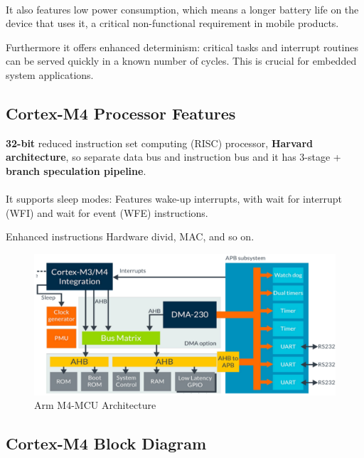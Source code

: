 \paragraph{}
It also features low power consumption, which means a longer battery life on the device that uses it, a
critical non-functional requirement in mobile products.

Furthermore it offers enhanced determinism: critical tasks and interrupt routines can be served quickly in
a known number of cycles. This is crucial for embedded system applications.

\subsection{Cortex-M4 Processor Features}

\textbf{32-bit} reduced instruction set computing (RISC) processor, \textbf{Harvard architecture}, so separate data bus and instruction bus and it has 3-stage + \textbf{branch speculation pipeline}.

\paragraph{}
It supports sleep modes: Features wake-up interrupts, with wait for interrupt (WFI) and wait for event (WFE) instructions.

Enhanced instructions Hardware divid, MAC, and so on.

\begin{figure}[H]
    \centering
    \includegraphics[width=1\linewidth]{img/image13.png}
    \caption{Arm M4-MCU Architecture}
\end{figure}

\subsection{Cortex-M4 Block Diagram}

